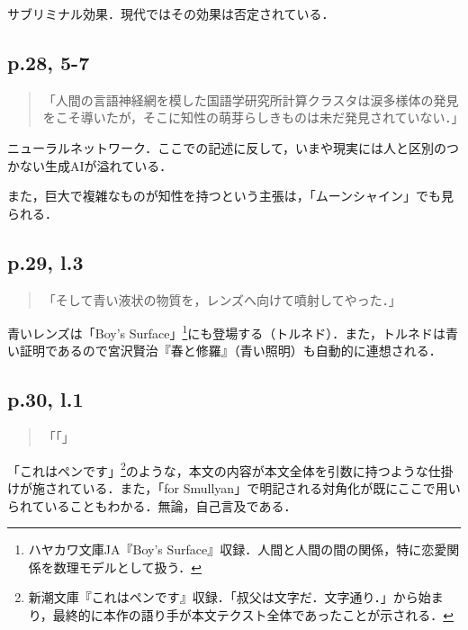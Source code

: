 \documentclass[10pt, a5paper, twoside]{jsarticle}
\theoremstyle{definition}
\begin{document}
			サブリミナル効果．現代ではその効果は否定されている．

		\subsection{p.28, 5-7}

			\begin{quote}
				
				「人間の言語神経網を模した国語学研究所計算クラスタは涙多様体の発見をこそ導いたが，そこに知性の萌芽らしきものは未だ発見されていない．」

			\end{quote}

			ニューラルネットワーク．ここでの記述に反して，いまや現実には人と区別のつかない生成AIが溢れている．

			また，巨大で複雑なものが知性を持つという主張は，「ムーンシャイン」でも見られる．

		\subsection{p.29, l.3}

			\begin{quote}
				
				「そして青い液状の物質を，レンズへ向けて噴射してやった．」

			\end{quote}

			青いレンズは「Boy's Surface」\footnote{ハヤカワ文庫JA『Boy's Surface』収録．人間と人間の間の関係，特に恋愛関係を数理モデルとして扱う．}にも登場する（トルネド）．また，トルネドは青い証明であるので宮沢賢治『春と修羅』（青い照明）も自動的に連想される．

		\subsection{p.30, l.1}

			\begin{quote}
				
				「「」

			\end{quote}

			「これはペンです」\footnote{新潮文庫『これはペンです』収録．「叔父は文字だ．文字通り．」から始まり，最終的に本作の語り手が本文テクスト全体であったことが示される．}のような，本文の内容が本文全体を引数に持つような仕掛けが施されている．また，「for Smullyan」で明記される対角化が既にここで用いられていることもわかる．無論，自己言及である．
\end{document}
